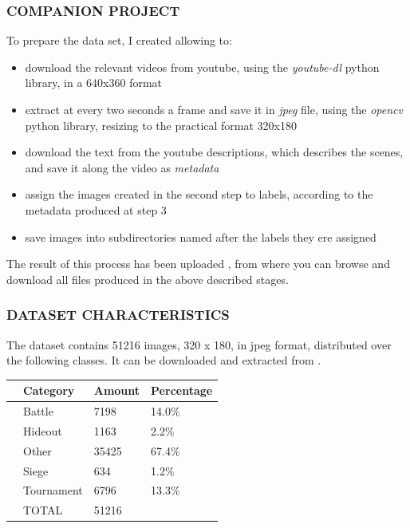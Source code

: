 \documentclass[
]{article}
\providecommand{\tightlist}{%
  \setlength{\itemsep}{0pt}\setlength{\parskip}{0pt}}
\newcommand{\hhref}[3][blue]{\href{#2}{\color{#1}{#3}}}%
\begin{document}
\hypertarget{companion-projects}{%
\subsubsection{COMPANION PROJECT}\label{companion-projects}}

To prepare the data set, I created \hhref{https://github.com/diegoami/DA_split_youtube_frames\_s3/}{a companion project} allowing to:

\begin{itemize}
\tightlist
\item
  download the relevant videos from youtube, using the
  \emph{youtube-dl} python library, in a 640x360 format
\item
  extract at every two seconds a frame and save it in \emph{jpeg} file, using
  the \emph{opencv} python library, resizing to the practical format
  320x180
\item
  download the text from the youtube descriptions, which describes the scenes, and save it along the
  video as \emph{metadata}
\item
  assign the images created in the second step to labels, according to the metadata produced at step 3
\item 
  save images into subdirectories named after the labels they ere assigned   
\end{itemize}


The result of this process has been uploaded \hhref{https://da-youtube-ml.s3.eu-central-1.amazonaws.com/}{to a public bucket on Amazon S3}, from where you can browse and download all files produced in the above described stages.

\hypertarget{dataset-characteristics}{%
\subsubsection{DATASET CHARACTERISTICS}\label{dataset-characteristics}}

The dataset contains 51216 images, 320 x 180, in jpeg format,
distributed over the following classes. It can be downloaded and extracted from \hhref{https://da-youtube-ml.s3.eu-central-1.amazonaws.com/wendy-cnn/frames/wendy_cnn_frames_data_5.zip}{this zip file on S3}.

\begin{longtable}[]{@{}llll@{}}
\toprule
& Category & Amount & Percentage\tabularnewline
\midrule
\endhead
& Battle & 7198 & 14.0\%\tabularnewline
& Hideout & 1163 & 2.2\%\tabularnewline
& Other & 35425 & 67.4\%\tabularnewline
& Siege & 634 & 1.2\%\tabularnewline
& Tournament & 6796 & 13.3\%\tabularnewline
& TOTAL & 51216 &\tabularnewline
\bottomrule
\end{longtable}
\end{document}
